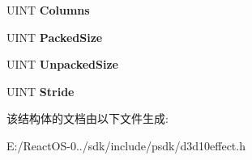 \begin{DoxyCompactItemize}
\mbox{\label{struct___d3_d10___e_f_f_e_c_t___t_y_p_e___d_e_s_c_aa9c10a032329ed59fa2149ee7a3ea33e}} 
U\+I\+NT {\bfseries Columns}
\item 
\mbox{\label{struct___d3_d10___e_f_f_e_c_t___t_y_p_e___d_e_s_c_a4b6e27fdd78b813be9178956c42add39}} 
U\+I\+NT {\bfseries Packed\+Size}
\item 
\mbox{\label{struct___d3_d10___e_f_f_e_c_t___t_y_p_e___d_e_s_c_a0220f8f96772bfef2cc6729273c59832}} 
U\+I\+NT {\bfseries Unpacked\+Size}
\item 
\mbox{\label{struct___d3_d10___e_f_f_e_c_t___t_y_p_e___d_e_s_c_a70c13404b012bfd5453b36c77538e9bb}} 
U\+I\+NT {\bfseries Stride}
\end{DoxyCompactItemize}


该结构体的文档由以下文件生成\+:\begin{DoxyCompactItemize}
\item 
E\+:/\+React\+O\+S-\/0../sdk/include/psdk/d3d10effect.\+h\end{DoxyCompactItemize}
